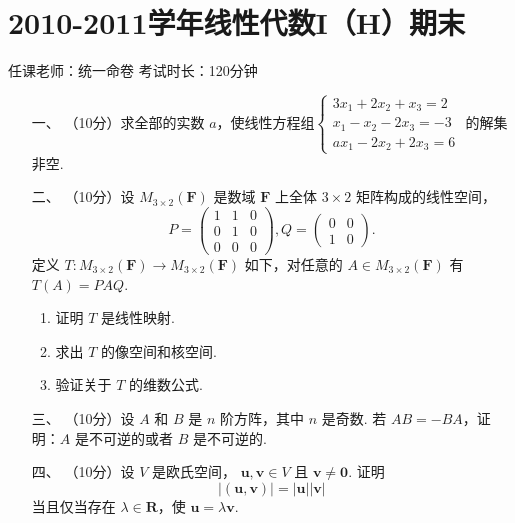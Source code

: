 \section*{2010-2011学年线性代数I（H）期末}

\begin{center}
    任课老师：统一命卷\hspace{4em} 考试时长：120分钟
\end{center}

\begin{enumerate}
    \item [一、]（10分）求全部的实数 $a$，使线性方程组$\begin{cases} 3x_1+2x_2+x_3=2 \\ x_1-x_2-2x_3=-3 \\ ax_1-2x_2+2x_3 = 6\end{cases}$ 的解集非空.

    \item [二、]（10分）设 $M_{3\times2} (\mathbf{F})$ 是数域 $\mathbf{F}$ 上全体 $3\times 2$ 矩阵构成的线性空间，
    \[P = \begin{pmatrix}1 & 1 & 0 \\ 0 & 1 & 0 \\ 0 & 0 & 0\end{pmatrix},Q=\begin{pmatrix}0 & 0 \\ 1 & 0\end{pmatrix}.\]
    定义 $T:M_{3\times 2}(\mathbf{F}) \to M_{3\times2} (\mathbf{F})$ 如下，对任意的 $A\in M_{3\times2}(\mathbf{F})$ 有 $T(A) = PAQ$.
    \begin{enumerate}[label=(\arabic*)]
        \item 证明 $T$ 是线性映射.

        \item 求出 $T$ 的像空间和核空间.

        \item 验证关于 $T$ 的维数公式.
    \end{enumerate}

\item [三、]（10分）设 $A$ 和 $B$ 是 $n$ 阶方阵，其中 $n$ 是奇数. 若 $AB=-BA$，证明：$A$ 是不可逆的或者 $B$ 是不可逆的.

    \item [四、]（10分）设 $V$ 是欧氏空间， $\mathbf{u,v}\in V$ 且 $\mathbf{v} \neq \mathbf{0}$.  证明
    \[\lvert(\mathbf{u,v}) \rvert =\lvert \mathbf{u} \rvert \lvert \mathbf{v} \rvert \]
    当且仅当存在 $\lambda \in \mathbf{R}$，使 $\mathbf{u} = \lambda \mathbf{v}$.


\end{enumerate}
